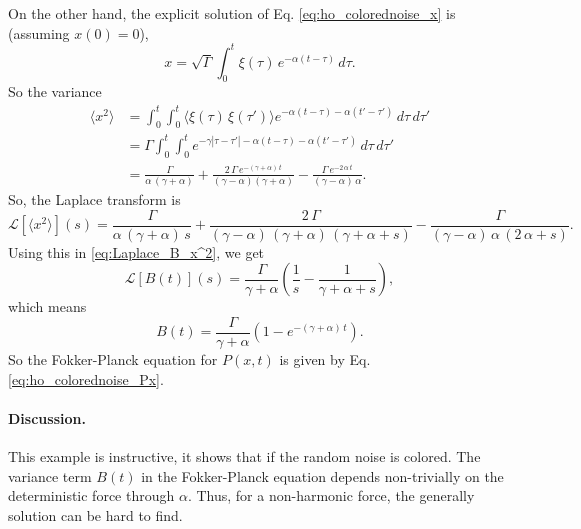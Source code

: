 \documentclass{article}
\begin{document}
On the other hand,
the explicit solution of Eq. \eqref{eq:ho_colorednoise_x} is
(assuming $x(0) = 0$),
$$
x = \sqrt{\Gamma} \int_0^t \xi(\tau) \, e^{-\alpha(t-\tau)}  \, d\tau.
$$
So the variance
$$
\begin{aligned}
\langle x^2 \rangle
&=
\int_0^t\int_0^t \langle \xi(\tau) \, \xi(\tau') \rangle
e^{-\alpha(t-\tau)-\alpha(t'-\tau')} \, d\tau \, d\tau'
\\
&=
\Gamma \int_0^t\int_0^t
e^{-\gamma|\tau - \tau'|-\alpha(t-\tau)-\alpha(t'-\tau')} \, d\tau \, d\tau'
\\
&=
  \frac{\Gamma }{\alpha\,(\gamma + \alpha) }
  +
  \frac{2 \, \Gamma \, e^{-(\gamma + \alpha) \, t} }{(\gamma - \alpha) (\gamma + \alpha) }
  -
  \frac{\Gamma \, e^{-2 \, \alpha \, t} }{(\gamma - \alpha) \, \alpha }.
\end{aligned}
$$
So, the Laplace transform is
$$
\mathcal L[\langle x^2 \rangle](s)
=
  \frac{ \Gamma } { \alpha \, (\gamma + \alpha) \, s }
  +
  \frac{ 2 \, \Gamma } { (\gamma - \alpha) \, (\gamma + \alpha) \, (\gamma + \alpha + s) }
  -
  \frac{ \Gamma } { (\gamma - \alpha ) \, \alpha \, (2 \, \alpha + s) }.
$$
Using this in \eqref{eq:Laplace_B_x^2}, we get
$$
\mathcal L[B(t)](s) =
  \frac{ \Gamma }{ \gamma + \alpha }
  \left( \frac{1}{s} - \frac{1}{ \gamma + \alpha + s } \right),
$$
which means
$$
B(t) = \frac{ \Gamma } { \gamma + \alpha } \left( 1 - e^{-(\gamma + \alpha) \,t} \right).
$$
So the Fokker-Planck equation for $P(x, t)$ is given by
Eq. \eqref{eq:ho_colorednoise_Px}.

\paragraph{Discussion.}

This example is instructive,
it shows that if the random noise is colored.
%
The variance term $B(t)$ in the Fokker-Planck equation
depends non-trivially on the deterministic force through $\alpha$.
%
Thus, for a non-harmonic force, the generally solution
can be hard to find.
\end{document}
